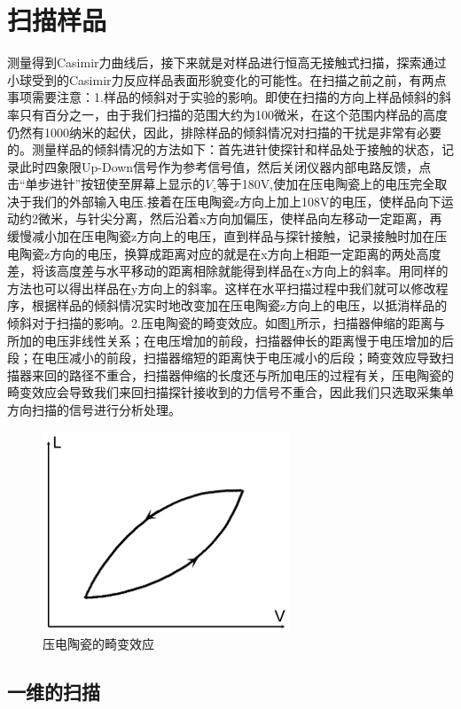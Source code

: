 \section{扫描样品}
测量得到Casimir力曲线后，接下来就是对样品进行恒高无接触式扫描，探索通过小球受到的Casimir力反应样品表面形貌变化的可能性。在扫描之前之前，有两点事项需要注意：1.样品的倾斜对于实验的影响。即使在扫描的方向上样品倾斜的斜率只有百分之一，由于我们扫描的范围大约为100微米，在这个范围内样品的高度仍然有1000纳米的起伏，因此，排除样品的倾斜情况对扫描的干扰是非常有必要的。测量样品的倾斜情况的方法如下：首先进针使探针和样品处于接触的状态，记录此时四象限Up-Down信号作为参考信号值，然后关闭仪器内部电路反馈，点击“单步进针”按钮使至屏幕上显示的$V_z$等于180V,使加在压电陶瓷上的电压完全取决于我们的外部输入电压.接着在压电陶瓷z方向上加上108V的电压，使样品向下运动约2微米，与针尖分离，然后沿着x方向加偏压，使样品向左移动一定距离，再缓慢减小加在压电陶瓷z方向上的电压，直到样品与探针接触，记录接触时加在压电陶瓷z方向的电压，换算成距离对应的就是在x方向上相距一定距离的两处高度差，将该高度差与水平移动的距离相除就能得到样品在x方向上的斜率。用同样的方法也可以得出样品在y方向上的斜率。这样在水平扫描过程中我们就可以修改程序，根据样品的倾斜情况实时地改变加在压电陶瓷z方向上的电压，以抵消样品的倾斜对于扫描的影响。2.压电陶瓷的畸变效应。如图\ref{fig:14}所示，扫描器伸缩的距离与所加的电压非线性关系；在电压增加的前段，扫描器伸长的距离慢于电压增加的后段；在电压减小的前段，扫描器缩短的距离快于电压减小的后段；畸变效应导致扫描器来回的路径不重合，扫描器伸缩的长度还与所加电压的过程有关，压电陶瓷的畸变效应会导致我们来回扫描探针接收到的力信号不重合，因此我们只选取采集单方向扫描的信号进行分析处理。
\begin{figure}[h]
	\centering
	\includegraphics[scale=0.5]{figures/压电陶瓷的畸变效应}
	\caption{压电陶瓷的畸变效应}
	\label{fig:14}
\end{figure}
\subsection{一维的扫描}
